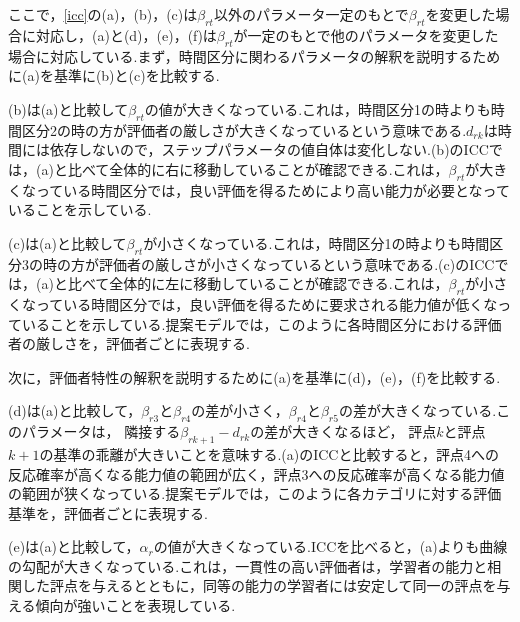 \documentclass[a4paper,11pt,oneside,openany]{jsbook}
\begin{document}
ここで，\ref{icc}の(a)，(b)，(c)は$\beta_{rt}$以外のパラメータ一定のもとで$\beta_{rt}$を変更した場合に対応し，(a)と(d)，(e)，(f)は$\beta_{rt}$が一定のもとで他のパラメータを変更した場合に対応している.まず，時間区分に関わるパラメータの解釈を説明するために(a)を基準に(b)と(c)を比較する.

(b)は(a)と比較して$\beta_{rt}$の値が大きくなっている.これは，時間区分1の時よりも時間区分2の時の方が評価者の厳しさが大きくなっているという意味である.$d_{rk}$は時間には依存しないので，ステップパラメータの値自体は変化しない.(b)のICCでは，(a)と比べて全体的に右に移動していることが確認できる.これは，$\beta_{rt}$が大きくなっている時間区分では，良い評価を得るためにより高い能力が必要となっていることを示している.

(c)は(a)と比較して$\beta_{rt}$が小さくなっている.これは，時間区分1の時よりも時間区分3の時の方が評価者の厳しさが小さくなっているという意味である.(c)のICCでは，(a)と比べて全体的に左に移動していることが確認できる.これは，$\beta_{rt}$が小さくなっている時間区分では，良い評価を得るために要求される能力値が低くなっていることを示している.提案モデルでは，このように各時間区分における評価者の厳しさを，評価者ごとに表現する.

次に，評価者特性の解釈を説明するために(a)を基準に(d)，(e)，(f)を比較する.

(d)は(a)と比較して，$\beta_{r3}$と$\beta_{r4}$の差が小さく，$\beta_{r4}$と$\beta_{r5}$の差が大きくなっている.このパラメータは， 隣接する$\beta_{rk+1} − d_{rk}$の差が大きくなるほど， 評点$k$と評点$k+1$の基準の乖離が大きいことを意味する.(a)のICCと比較すると，評点4への反応確率が高くなる能力値の範囲が広く，評点3への反応確率が高くなる能力値の範囲が狭くなっている.提案モデルでは，このように各カテゴリに対する評価基準を，評価者ごとに表現する.

(e)は(a)と比較して，$\alpha_r$の値が大きくなっている.ICCを比べると，(a)よりも曲線の勾配が大きくなっている.これは，一貫性の高い評価者は，学習者の能力と相関した評点を与えるとともに，同等の能力の学習者には安定して同一の評点を与える傾向が強いことを表現している.
\end{document}
